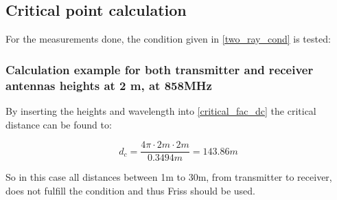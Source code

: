\subsection{Critical point calculation}
For the measurements done, the condition given in \eqref{two_ray_cond} is tested:


\subsubsection{Calculation example for both transmitter and receiver antennas heights at 2 m, at 858MHz}

By inserting the heights and wavelength into \eqref{critical_fac_dc} the critical distance can be found to:

\begin{equation}
d_{c} = \frac{4\pi \cdot 2m \cdot 2m}{0.3494m} = 143.86m
\label{critical_fac_dc_calc_2_2_858MHz}
\end{equation}

So in this case all distances between 1m to 30m, from transmitter to receiver, does not fulfill the condition and thus Friss should be used. 










